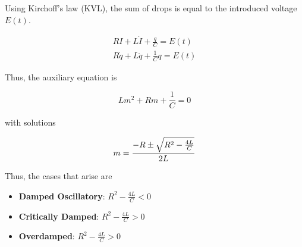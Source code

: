 Using Kirchoff's law (KVL), the sum of drops is equal to the introduced voltage $E(t)$.

\begin{align}
    RI+L\dot I+\frac{q}{C}=E(t)\\
    R\dot q+L\ddot q+\frac{1}{C}q=E(t)
\end{align}

Thus, the auxiliary equation is

\begin{equation}
    Lm^2+Rm+\frac{1}{C}=0
\end{equation}

with solutions

\begin{equation}
    m=\frac{-R\pm \sqrt{R^2-\frac{4L}{C}}}{2L}\\
\end{equation}

Thus, the cases that arise are
\begin{itemize}
    \item \textbf{Damped Oscillatory}: $R^2-\frac{4L}{C}<0$
    \item \textbf{Critically Damped}: $R^2-\frac{4L}{C}>0$
    \item \textbf{Overdamped}: $R^2-\frac{4L}{C}>0$
\end{itemize}